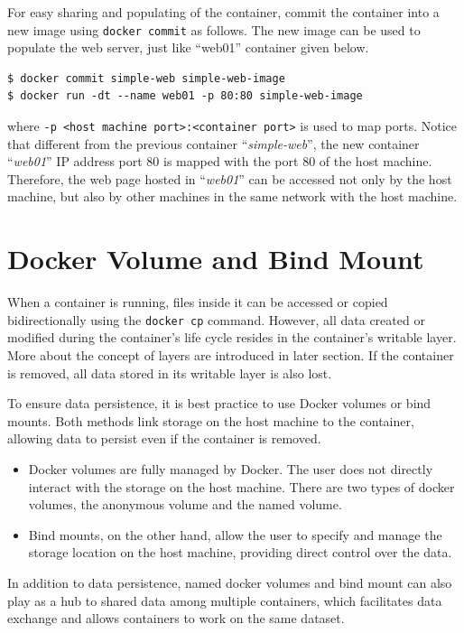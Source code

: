For easy sharing and populating of the container, commit the container into a new image using \verb|docker commit| as follows. The new image can be used to populate the web server, just like ``web01'' container given below.
\begin{lstlisting}
$ docker commit simple-web simple-web-image
$ docker run -dt --name web01 -p 80:80 simple-web-image
\end{lstlisting}
where \verb|-p <host machine port>:<container port>| is used to map ports. Notice that different from the previous container ``\textit{simple-web}'', the new container ``\textit{web01}'' IP address port 80 is mapped with the port 80 of the host machine. Therefore, the web page hosted in ``\textit{web01}'' can be accessed not only by the host machine, but also by other machines in the same network with the host machine.

\section{Docker Volume and Bind Mount} \label{ch:vac:subsec:dockervolume}

When a container is running, files inside it can be accessed or copied bidirectionally using the \verb|docker cp| command. However, all data created or modified during the container's life cycle resides in the container's writable layer. More about the concept of layers are introduced in later section. If the container is removed, all data stored in its writable layer is also lost.

To ensure data persistence, it is best practice to use Docker volumes or bind mounts. Both methods link storage on the host machine to the container, allowing data to persist even if the container is removed.
\begin{itemize}
  \item Docker volumes are fully managed by Docker. The user does not directly interact with the storage on the host machine. There are two types of docker volumes, the anonymous volume and the named volume.
  \item Bind mounts, on the other hand, allow the user to specify and manage the storage location on the host machine, providing direct control over the data.
\end{itemize}

In addition to data persistence, named docker volumes and bind mount can also play as a hub to shared data among multiple containers, which facilitates data exchange and allows containers to work on the same dataset. 

